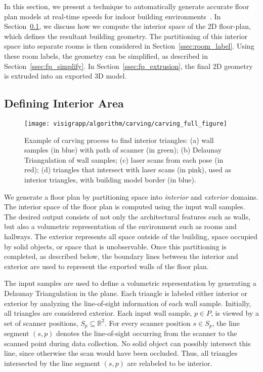 \documentclass[12pt,onecolumn,oneside]{book}
\begin{document}
In this section, we present a technique to automatically generate accurate floor plan models at real-time speeds for indoor building environments~\cite{Turner14}.  In Section~\ref{ssec:visigrapp_carving}, we discuss how we compute the interior space of the 2D floor-plan, which defines the resultant building geometry.  The partitioning of this interior space into separate rooms is then considered in Section~\ref{ssec:room_label}.  Using these room labels, the geometry can be simplified, as described in Section~\ref{ssec:fp_simplify}.  In Section~\ref{ssec:fp_extrusion}, the final 2D geometry is extruded into an exported 3D model.

\subsection{Defining Interior Area}
\label{ssec:visigrapp_carving}

\begin{figure}[t]
  \centering
  \texttt{[image: visigrapp/algorithm/carving/carving\_full\_figure]}
  \caption[Carving process to find interior triangles.]{Example of carving process to find interior triangles:  (a) wall samples (in blue) with path of scanner (in green); (b) Delaunay Triangulation of wall samples; (c) laser scans from each pose (in red); (d) triangles that intersect with laser scans (in pink), used as interior triangles, with building model border (in blue).}
  \label{fig:visigrapp_floorplan_creation}
\end{figure}

We generate a floor plan by partitioning space into {\it interior} and {\it exterior} domains.  The interior space of the floor plan is computed using the input wall samples.  The desired output consists of not only the architectural features such as walls, but also a volumetric representation of the environment such as rooms and hallways.  The exterior represents all space outside of the building, space occupied by solid objects, or space that is unobservable.  Once this partitioning is completed, as described below, the boundary lines between the interior and exterior are used to represent the exported walls of the floor plan.

The input samples are used to define a volumetric representation by generating a Delaunay Triangulation in the plane.  Each triangle is labeled either interior or exterior by analyzing the line-of-sight information of each wall sample.  Initially, all triangles are considered exterior.  Each input wall sample, $p \in P$, is viewed by a set of scanner positions, $S_p \subseteq \mathbb{R}^2$.  For every scanner position $s \in S_p$, the line segment $(s,p)$ denotes the line-of-sight occurring from the scanner to the scanned point during data collection.  No solid object can possibly intersect this line, since otherwise the scan would have been occluded.  Thus, all triangles intersected by the line segment $(s,p)$ are relabeled to be interior.
\end{document}
